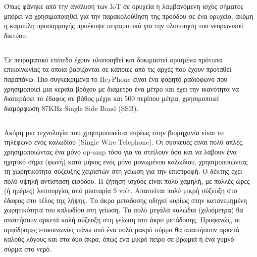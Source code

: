 \documentclass[12pt]{article}
\begin{document}
\begin{multicols*}{2}
        Όπως φάνηκε από την ανάλυση των IoT σε ορυχεία \cite*{ming_study_2019} η λαμβανόμενη ισχύς
        σήματος μπορεί να χρησιμοποιηθεί για την παρακολούθηση της προόδου σε ένα ορυχείο, ακόμη 
        η καμπύλη προσαρμογής προέκυψε πειραματικά για την υλοποιηση του νευρωνικού δικτύου.



    \subsection{}
        Σε πειραματικό επίπεδο έχουν υλοποιηθεί και δοκιμαστεί ορισμένα πρότυπα επικοινωνίας
        τα οποία βασίζονται σε κάποιες από τις αρχές που έχουν προταθεί παραπάνω. Πιο
        συγκεκριμένα το HeyPhone είναι ένα φορητό ραδιόφωνο που χρησιμοποιεί μια κεραία βρόχου
        με διάμετρο ένα μέτρο και έχει την ικανότητα να διαπεράσει το έδαφος σε βάθος μέχρι
        και 500 περίπου μέτρα, χρησιμοποιεί διαμόρφωση 87KHz Single Side Band (SSB).

    \subsection{}
        Ακόμη μια τεχνολογία που χρησιμοποιείται ευρέως στην βιομηχανία είναι το τηλέφωνο
        ενός καλωδίου (Single Wire Telephone). Οι συσκευές είναι πολύ απλές, χρησιμοποιώντας
        ένα μόνο op-amp τόσο για να στείλουν όσο και να λάβουν ένα ηχητικό σήμα (φωνή) κατά
        μήκος ενός μόνο μονωμένου καλωδίου, χρησιμοποιώντας τη χωρητικότητα σύζευξης χειριστών
        στη γείωση για την επιστροφή. Ο δέκτης έχει πολύ υψηλή αντίσταση εισόδου. Η ζήτηση
        ισχύος είναι πολύ χαμηλή, με πολλές ώρες (ή ημέρες) λειτουργίας από μπαταρία 9 volt.
        Απαιτείται πολύ μικρή σύζευξη στο έδαφος στο τέλος της λήψης. Το άκρο μετάδοσης οδηγεί
        κυρίως στην κατανεμημένη χωρητικότητα του καλωδίου στη γείωση. Τα πολύ μεγάλα καλώδια
        (χιλιόμετρα) θα απαιτήσουν αρκετά καλή σύζευξη στη γείωση στο άκρο μετάδοσης.
        Προφανώς, οι αμφίδρομες επικοινωνίες πάνω από ένα πολύ μακρύ σύρμα θα απαιτήσουν
        αρκετά καλούς λόγους και στα δύο άκρα, όπως ένα μικρό πείρο σε βρωμιά ή ένα γυμνό
        σύρμα στο νερό.

    \printbibliography
\end{multicols*}
\end{document}
